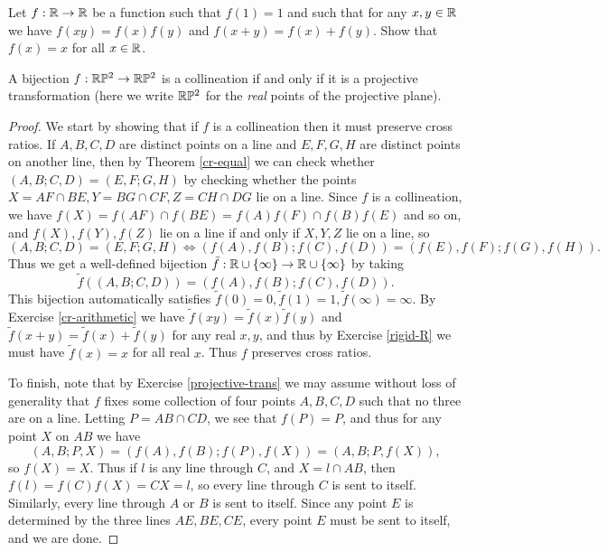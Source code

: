 \begin{exer}\label{rigid-R} Let $f:\mathbb{R}\rightarrow\mathbb{R}$ be a function such that $f(1) = 1$ and such that for any $x,y \in \mathbb{R}$ we have $f(xy) = f(x)f(y)$ and $f(x+y) = f(x)+f(y)$. Show that $f(x) = x$ for all $x\in \mathbb{R}$.
\end{exer}

\begin{thm} A bijection $f:\mathbb{R}\mathbb{P}^2 \rightarrow \mathbb{R}\mathbb{P}^2$ is a collineation if and only if it is a projective transformation (here we write $\mathbb{R}\mathbb{P}^2$ for the \emph{real} points of the projective plane).
\end{thm}
\begin{proof} We start by showing that if $f$ is a collineation then it must preserve cross ratios. If $A,B,C,D$ are distinct points on a line and $E,F,G,H$ are distinct points on another line, then by Theorem \ref{cr-equal} we can check whether $(A,B;C,D) = (E,F;G,H)$ by checking whether the points $X = AF\cap BE, Y = BG\cap CF, Z = CH\cap DG$ lie on a line. Since $f$ is a collineation, we have $f(X) = f(AF)\cap f(BE) = f(A)f(F)\cap f(B)f(E)$ and so on, and $f(X), f(Y), f(Z)$ lie on a line if and only if $X,Y,Z$ lie on a line, so
\[
(A,B;C,D) = (E,F;G,H) \iff (f(A),f(B);f(C),f(D)) = (f(E),f(F);f(G),f(H)).
\]
Thus we get a well-defined bijection $\tilde{f}:\mathbb{R}\cup\{\infty\}\rightarrow\mathbb{R}\cup\{\infty\}$ by taking
\[
\tilde{f}((A,B;C,D)) = (f(A),f(B);f(C),f(D)).
\]
This bijection automatically satisfies $\tilde{f}(0) = 0, \tilde{f}(1) = 1, \tilde{f}(\infty) = \infty$. By Exercise \ref{cr-arithmetic} we have $\tilde{f}(xy) = \tilde{f}(x)\tilde{f}(y)$ and $\tilde{f}(x+y) = \tilde{f}(x)+\tilde{f}(y)$ for any real $x,y$, and thus by Exercise \ref{rigid-R} we must have $\tilde{f}(x) = x$ for all real $x$. Thus $f$ preserves cross ratios.

To finish, note that by Exercise \ref{projective-trans} we may assume without loss of generality that $f$ fixes some collection of four points $A,B,C,D$ such that no three are on a line. Letting $P = AB\cap CD$, we see that $f(P) = P$, and thus for any point $X$ on $AB$ we have
\[
(A,B;P,X) = (f(A),f(B);f(P),f(X)) = (A,B;P,f(X)),
\]
so $f(X) = X$. Thus if $l$ is any line through $C$, and $X = l \cap AB$, then $f(l) = f(C)f(X) = CX = l$, so every line through $C$ is sent to itself. Similarly, every line through $A$ or $B$ is sent to itself. Since any point $E$ is determined by the three lines $AE,BE,CE$, every point $E$ must be sent to itself, and we are done.
\end{proof}

